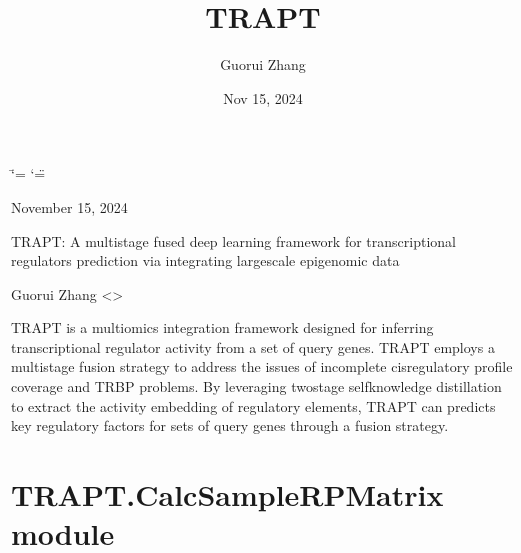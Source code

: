 \documentclass[letterpaper,10pt,english]{sphinxmanual}
\title{TRAPT}
\date{Nov 15, 2024}
\author{Guorui Zhang}
\begin{document}
\ifdefined\shorthandoff
  \ifnum\catcode`\=\string=\active\shorthandoff{=}\fi
  \ifnum\catcode`\"=\active{}\fi
\fi

\pagestyle{empty}
\sphinxmaketitle
\pagestyle{plain}
\sphinxtableofcontents
\pagestyle{normal}
\label{\detokenize{index::doc}}


\sphinxAtStartPar
November 15, 2024

\sphinxAtStartPar
{} TRAPT: A multi\sphinxhyphen{}stage fused deep learning framework for transcriptional
regulators prediction via integrating large\sphinxhyphen{}scale epigenomic data

\sphinxAtStartPar
{} Guorui Zhang \textless{}\textgreater{}

\sphinxAtStartPar
{} TRAPT is a multi\sphinxhyphen{}omics integration framework designed
for inferring transcriptional regulator activity from a set of query genes.
TRAPT employs a multi\sphinxhyphen{}stage fusion strategy to address the issues
of incomplete cis\sphinxhyphen{}regulatory profile coverage and TRBP problems.
By leveraging two\sphinxhyphen{}stage self\sphinxhyphen{}knowledge distillation to extract the activity
embedding of regulatory elements, TRAPT can predicts key regulatory
factors for sets of query genes through a fusion strategy.


\chapter{TRAPT.CalcSampleRPMatrix module}
\label{\detokenize{index:module-TRAPT.CalcSampleRPMatrix}}\label{\detokenize{index:trapt-calcsamplerpmatrix-module}}
\end{document}
